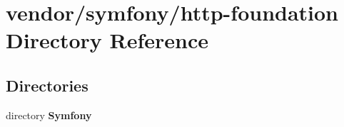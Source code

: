 \section{vendor/symfony/http-\/foundation Directory Reference}
\label{dir_09dbfa2c8cdcc932e076f198f69e2dc0}
\subsection*{Directories}
\begin{DoxyCompactItemize}
\item 
directory {\bf Symfony}
\end{DoxyCompactItemize}
